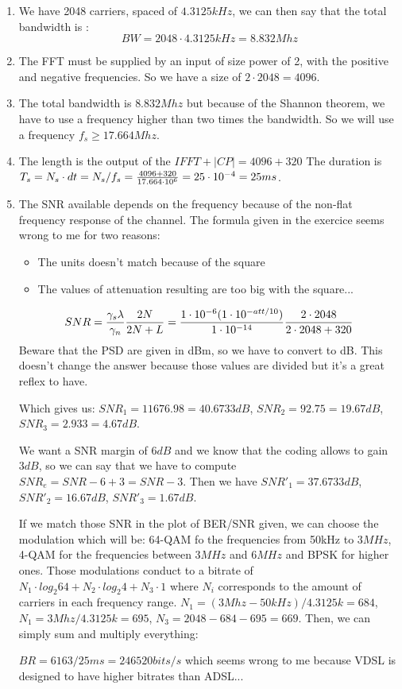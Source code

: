 
\begin{solution}
	\begin{enumerate}
		\item We have 2048 carriers, spaced of $4.3125kHz$, we can then say that the total bandwidth is : 
			  $$BW = 2048\cdot 4.3125kHz = 8.832 Mhz$$
		\item The FFT must be supplied by an input of size power of 2, with the positive and negative frequencies. So we have a size of $2\cdot 2048 = 4096$.
		\item The total bandwidth is $8.832 Mhz$ but because of the Shannon theorem, we have to use a frequency higher than two times the bandwidth. So we will use a frequency $f_s \geq 17.664Mhz$.
		\item The length is the output of the $IFFT + |CP| = 4096 + 320$ The duration is $T_s = N_s \cdot dt = N_s/f_s = \frac{4096 + 320}{17.664\cdot 10^{6}} = 25\cdot 10^{-4} = 25ms$.
		\item The SNR available depends on the frequency because of the non-flat frequency response of the channel. The formula given in the exercice seems wrong to me for two reasons:
		\begin{itemize}
			\item The units doesn't match because of the square
			\item The values of attenuation resulting are too big with the square...
		\end{itemize}				
		
		$$
		SNR = \frac{\gamma_s \lambda}{\gamma_n}\frac{2N}{2N + L} = \frac{1\cdot 10^{-6} (1\cdot 10^{-att/10})}{1\cdot 10^{-14}}\frac{2\cdot 2048}{2\cdot 2048 + 320}
		$$
		Beware that the PSD are given in dBm, so we have to convert to dB. This doesn't change the answer because those values are divided but it's a great reflex to have.
		
		
		Which gives us: $SNR_{1} = 11676.98 = 40.6733 dB$, $SNR_{2} = 92.75 = 19.67 dB$, $SNR_{3} = 2.933 = 4.67 dB$.
		
		We want a SNR margin of $6dB$ and we know that the coding allows to gain $3dB$, so we can say that we have to compute $SNR_e = SNR - 6 + 3 = SNR - 3$.
		Then we have $SNR'_{1} = 37.6733 dB$, $SNR'_{2} = 16.67 dB$, $SNR'_{3} = 1.67 dB$.
		
		If we match those SNR in the plot of BER/SNR given, we can choose the modulation which will be: 64-QAM fo the frequencies from 50kHz to $3MHz$, 4-QAM for the frequencies between $3MHz$ and $6MHz$ and BPSK for higher ones.
		Those modulations conduct to a bitrate of $N_1\cdot log_2 64 + N_2\cdot log_2 4 + N_3\cdot 1$ where $N_i$ corresponds to the amount of carriers in each frequency range. 
		$N_1 = (3Mhz - 50kHz)/4.3125k = 684$, $N_1 = 3Mhz/4.3125k = 695$, $N_3 = 2048 - 684 - 695 = 669$. Then, we can simply sum and multiply everything:
		
		
		$BR = 6163/25ms = 246520 bits/s$ which seems wrong to me because VDSL is designed to have higher bitrates than ADSL... \notsure	
						
	\end{enumerate}
\end{solution}


\begin{solution}
	
\end{solution}